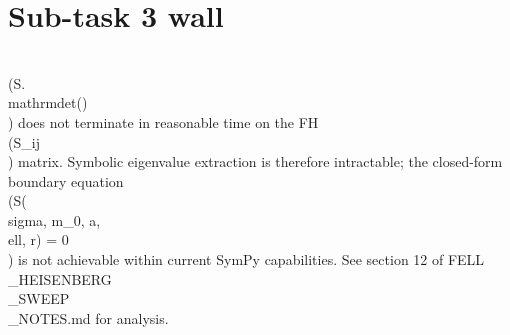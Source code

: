 \documentclass{article}
\begin{document}
\section{Sub-task 3 wall}
\\(S.\\mathrm{det}()\\) does not terminate in reasonable time on the FH \\(S_{ij}\\) matrix.
Symbolic eigenvalue extraction is therefore intractable; the closed-form boundary
equation \\(S(\\sigma, m_0, a, \\ell, r) = 0\\) is not achievable within current SymPy capabilities.
See section 12 of FELL\\_HEISENBERG\\_SWEEP\\_NOTES.md for analysis.
\end{document}
